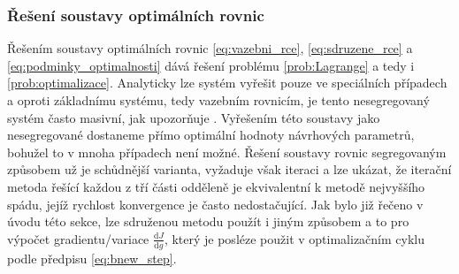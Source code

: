 \subsubsection{Řešení soustavy optimálních rovnic}
Řešením soustavy optimálních rovnic \ref{eq:vazebni_rce}, \ref{eq:sdruzene_rce} a \ref{eq:podminky_optimalnosti} dává řešení problému \ref{prob:Lagrange} a tedy i \ref{prob:optimalizace}. Analyticky lze systém vyřešit pouze ve speciálních případech a oproti základnímu systému, tedy vazebním rovnicím, je tento nesegregovaný systém často masivní, jak upozorňuje \cite{karman1997inverse}. Vyřešením této soustavy jako nesegregované dostaneme přímo optimální hodnoty návrhových parametrů, bohužel to v mnoha případech není možné. Řešení soustavy rovnic segregovaným způsobem už je schůdnější varianta, vyžaduje však iteraci a lze ukázat, že iterační metoda řešící každou z tří části odděleně je ekvivalentní k metodě nejvyššího spádu, jejíž rychlost konvergence je často nedostačující. Jak bylo již řečeno v úvodu této sekce, lze sdruženou metodu použít i jiným způsobem a to pro výpočet gradientu/variace $ \frac{\mathrm{d} J}{\mathrm{d} g} $, který je posléze použit v optimalizačním cyklu podle předpisu \ref{eq:bnew_step}.

